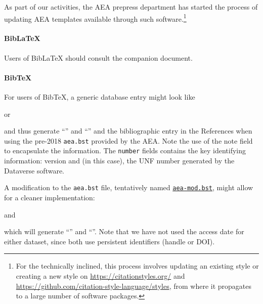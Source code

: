\documentclass[AEJ]{AEA}
\begin{document}
As part of our activities, the AEA prepress department has started the process of updating AEA templates available through such software.\footnote{For the technically inclined, this process involves updating an existing style or creating a new style on \url{https://citationstyles.org/} and \url{https://github.com/citation-style-language/styles}, from where it propagates to a large number of software packages.}  

\paragraph{BibLaTeX}
Users of BibLaTeX should consult the companion document.

\paragraph{BibTeX}
For users of BibTeX, a generic database entry might look like
\lstset{language=}

%
or

%
and thus generate ``\citet{duflopande2006}'' and ``\citet{leiss1999}'' and the bibliographic entry in the References when using the pre-2018 \texttt{aea.bst} provided by the \ac{AEA}. Note the use of the note field to encapsulate the information. The \texttt{number} fields contains the key identifying information: version and (in this case), the UNF number generated by the Dataverse software.

A modification to the \texttt{aea.bst} file, tentatively named \href{aea-mod.bst}{\texttt{aea-mod.bst}}, might allow for a cleaner implementation: 

and

which will generate ``\citet{duflopande2006-new}'' and ``\citet{leiss1999-new}''. Note that we have not used the access date for either dataset, since both use persistent identifiers (handle or DOI).


\newpage


\end{document}
